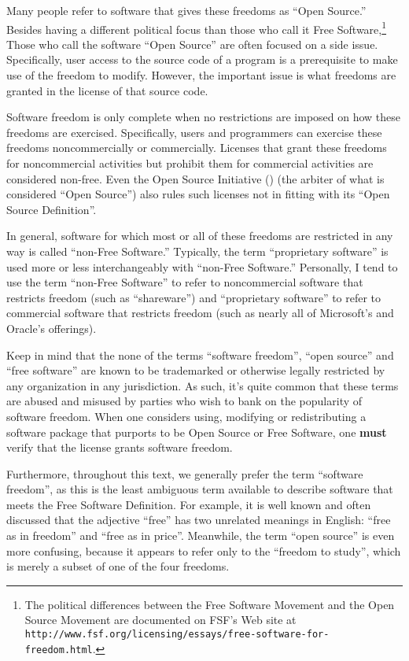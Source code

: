 Many people refer to software that gives these freedoms as ``Open Source.''
Besides having a different political focus than those who call it Free
Software,\footnote{The political differences between the Free Software
  Movement and the Open Source Movement are documented on FSF's Web site at
  {\tt http://www.fsf.org/licensing/essays/free-software-for-freedom.html}.}
Those who call the software ``Open Source'' are often focused on a side
issue.  Specifically, user access to the source code of a program is a
prerequisite to make use of the freedom to modify.  However, the important
issue is what freedoms are granted in the license of that source code.

Software freedom is only complete when no restrictions are imposed on how
these freedoms are exercised.  Specifically, users and programmers can
exercise these freedoms noncommercially or commercially.  Licenses that grant
these freedoms for noncommercial activities but prohibit them for commercial
activities are considered non-free.  Even the Open Source Initiative
() (the arbiter of what is considered ``Open Source'') also rules
such licenses not in fitting with its ``Open Source Definition''.

In general, software for which most or all of these freedoms are
restricted in any way is called ``non-Free Software.''  Typically, the
term ``proprietary software'' is used more or less interchangeably with
``non-Free Software.''  Personally, I tend to use the term ``non-Free
Software'' to refer to noncommercial software that restricts freedom
(such as ``shareware'') and ``proprietary software'' to refer to
commercial software that restricts freedom (such as nearly all of
Microsoft's and Oracle's offerings).

Keep in mind that the none of the terms ``software freedom'', ``open source''
and ``free software'' are known to be trademarked or otherwise legally
restricted by any organization in
any jurisdiction.  As such, it's quite common that these terms are abused and
misused by parties who wish to bank on the popularity of software freedom.
When one considers using, modifying or redistributing a software package that
purports to be Open Source or Free Software, one \textbf{must} verify that
the license grants software freedom.

Furthermore, throughout this text, we generally prefer the term ``software
freedom'', as this is the least ambiguous term available to describe software
that meets the Free Software Definition.  For example, it is well known and
often discussed that the adjective ``free'' has two unrelated meanings in
English: ``free as in freedom'' and ``free as in price''.  Meanwhile, the
term ``open source'' is even more confusing, because it appears to refer only to the
``freedom to study'', which is merely a subset of one of the four freedoms.

